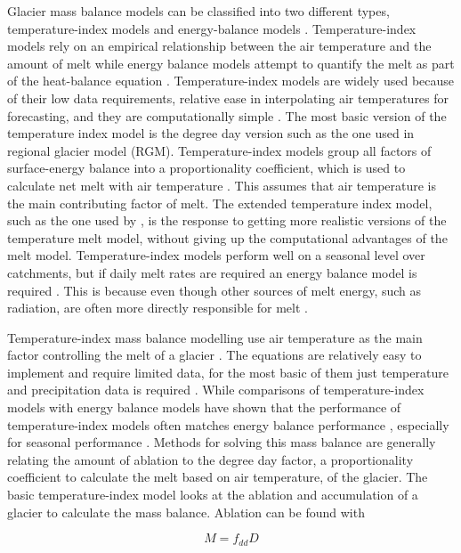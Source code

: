 \documentclass{article}
\begin{document}
Glacier mass balance models can be classified into two different types, temperature-index models and energy-balance models \citep{Hock2005}. Temperature-index models rely on an empirical relationship between the air temperature and the amount of melt while energy balance models attempt to quantify the melt as part of the heat-balance equation \citep{Hock2003}. Temperature-index models are widely used because of their low data requirements, relative ease in interpolating air temperatures for forecasting, and they are computationally simple \citep{Hock2003}. The most basic version of the temperature index model is the degree day version such as the one used in \citet{Clarke2015} regional glacier model (RGM). Temperature-index models group all factors of surface-energy balance into a proportionality coefficient, which is used to calculate net melt with air temperature \citep{Pradhananga2020}. This assumes that air temperature is the main contributing factor of melt. The extended temperature index model, such as the one used by \citet{Marzeion2012}, is the response to getting more realistic versions of the temperature melt model, without giving up the computational advantages of the melt model. Temperature-index models perform well on a seasonal level over catchments, but if daily melt rates are required an energy balance model is required \citep{Gudmundsson2009, Hock2003}. This is because even though other sources of melt energy, such as radiation, are often more directly responsible for melt \citep{Pradhananga2020}. 


Temperature-index mass balance modelling use air temperature as the main factor controlling the melt of a glacier \citep{Pradhananga2020}. The equations are relatively easy to implement and require limited data, for the most basic of them just temperature and precipitation data is required \citep{Clarke2015}. While comparisons of temperature-index models with energy balance models have shown that the performance of temperature-index models often matches energy balance performance \citep{Hock2005}, especially for seasonal performance \citep{Gudmundsson2009}. Methods for solving this mass balance are generally relating the amount of ablation to the degree day factor, a proportionality coefficient to calculate the melt based on air temperature, of the glacier\citep{Pradhananga2020}. The basic temperature-index model looks at the ablation and accumulation of a glacier to calculate the mass balance. Ablation can be found with

\begin{equation} \label{Melt}
M = f_{dd}D
\end{equation}
\end{document}

